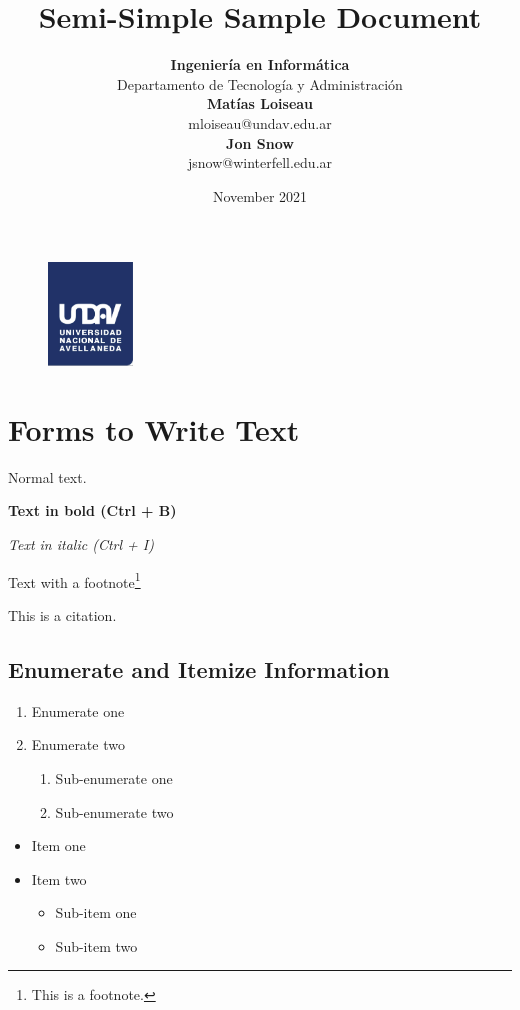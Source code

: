 \documentclass{article} %
\title{Semi-Simple Sample Document}
\date{November 2021}
\author{
    \textbf{Ingeniería en Informática}\\
    Departamento de Tecnología y Administración\\[2ex]
    \textbf{Matías Loiseau}\\
    mloiseau@undav.edu.ar\\[2ex]
    \textbf{Jon Snow}\\
    jsnow@winterfell.edu.ar
}
\begin{document}
\begin{figure}
    \centering
    \includegraphics[width=0.2\textwidth]{images/undav-logo}
    \label{fig:undav-logo}
\end{figure}

\maketitle %
\thispagestyle{empty} %
\cleardoublepage

\tableofcontents %
\cleardoublepage

\section{Forms to Write Text} %
Normal text.

\textbf{Text in bold (Ctrl + B)}

\textit{Text in italic (Ctrl + I)}

Text with a footnote\footnote{This is a footnote.}

This is a citation\cite{knn}.

\subsection{Enumerate and Itemize Information}

\begin{enumerate}
    \item Enumerate one
    \item Enumerate two
    \begin{enumerate}
        \item Sub-enumerate one
        \item Sub-enumerate two
    \end{enumerate}
\end{enumerate}

\begin{itemize}
    \item Item one
    \item Item two
    \begin{itemize}
        \item Sub-item one
        \item Sub-item two
    \end{itemize}
\end{itemize}
\end{document}
